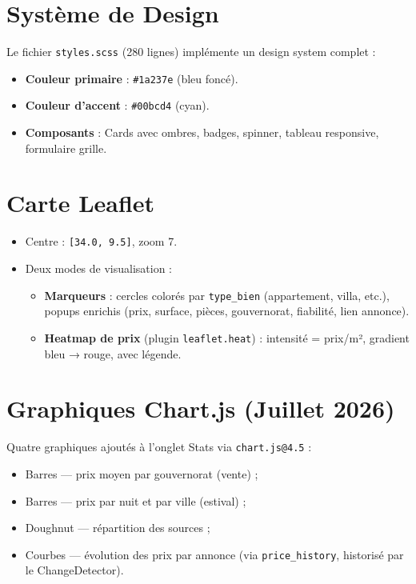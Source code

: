 \documentclass[12pt,a4paper]{report}
\begin{document}
\section{Système de Design}

Le fichier \texttt{styles.scss} (280 lignes) implémente un design system complet :
\begin{itemize}
    \item \textbf{Couleur primaire} : \texttt{\#1a237e} (bleu foncé).
    \item \textbf{Couleur d'accent} : \texttt{\#00bcd4} (cyan).
    \item \textbf{Composants} : Cards avec ombres, badges, spinner, tableau responsive, formulaire grille.
\end{itemize}

\section{Carte Leaflet}

\begin{itemize}
    \item Centre : \texttt{[34.0, 9.5]}, zoom 7.
    \item Deux modes de visualisation :
    \begin{itemize}
        \item \textbf{Marqueurs} : cercles colorés par \texttt{type\_bien} (appartement, villa, etc.), popups enrichis (prix, surface, pièces, gouvernorat, fiabilité, lien annonce).
        \item \textbf{Heatmap de prix} (plugin \texttt{leaflet.heat}) : intensité = prix/m², gradient bleu → rouge, avec légende.
    \end{itemize}
\end{itemize}

\section{Graphiques Chart.js (Juillet 2026)}

Quatre graphiques ajoutés à l'onglet Stats via \texttt{chart.js@4.5} :
\begin{itemize}
    \item Barres — prix moyen par gouvernorat (vente) ;
    \item Barres — prix par nuit et par ville (estival) ;
    \item Doughnut — répartition des sources ;
    \item Courbes — évolution des prix par annonce (via \texttt{price\_history}, historisé par le ChangeDetector).
\end{itemize}
\end{document}

